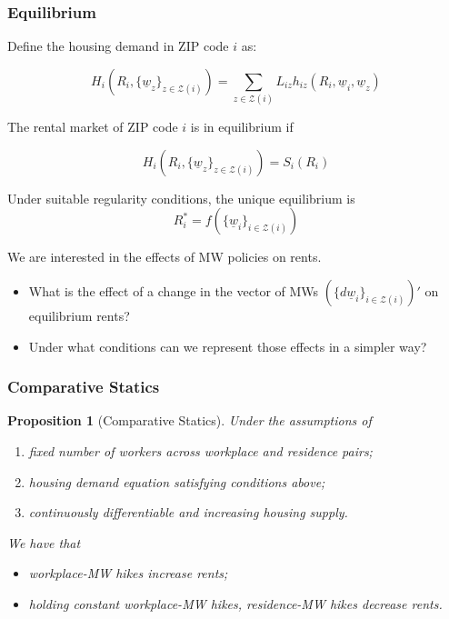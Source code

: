\documentclass[aspectratio=169, t]{beamer}
\newtheorem{prop}{Proposition}
\newcommand{\Z}{\mathcal{Z}}
\newcommand{\MW}{\underline{w}}
\begin{document}
\begin{frame}
    \frametitle{Equilibrium}
    
    Define the housing demand in ZIP code $i$ as:
    
     \[
     H_{i} (R_i, \{\MW_z\}_{z\in\Z(i)}) = \sum_{z\in\Z(i)} L_{iz} h_{iz} (R_i, \MW_i, \MW_z)
     \]
    
    The rental market of ZIP code $i$ is in equilibrium if
    
    $$ H_{i} (R_i, \{\MW_z\}_{z\in\Z(i)}) = S_i(R_i) $$
    
    Under suitable regularity conditions, the unique equilibrium is 
    $$R^*_i = f(\{\MW_i\}_{i\in\Z(i)})$$
    
    \vspace{3mm}
    \pause
    We are interested in the effects of MW policies on rents.
    \vspace{1mm}
    \begin{itemize} \small
        \item What is the effect of a change in the vector of MWs 
        $(\{d \MW_i\}_{i\in\Z(i)})'$ on equilibrium rents?
        \item Under what conditions can we represent those effects in a simpler way?
    \end{itemize}
\end{frame}

\begin{frame}[label = prop_comp_stat]
    \frametitle{Comparative Statics}
    
    \begin{prop}[Comparative Statics]\label{prop:comparative_statics}
        Under the assumptions of
        \begin{enumerate}
           \item fixed number of workers across workplace and residence pairs;
           \item housing demand equation satisfying conditions above; 
           \item continuously differentiable and increasing housing supply.
        \end{enumerate} 
        We have that
        \begin{itemize}
            \item workplace-MW hikes increase rents;
            \item holding constant workplace-MW hikes, residence-MW hikes decrease rents.
        \end{itemize}
    \end{prop}
\end{frame}
\end{document}
